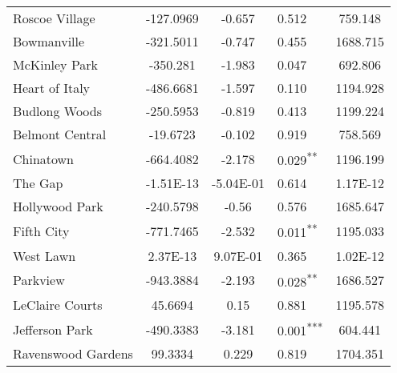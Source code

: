 \documentclass[12pt]{report}
\begin{document}
\begin{longtable}{l S[table-format=6.4] S[table-format=3.4] l S[table-format=4.4]}
	Roscoe Village               & -127.0969            & -0.657           & 0.512                      & 759.148                           \\
	Bowmanville                  & -321.5011            & -0.747           & 0.455                      & 1688.715                          \\
	McKinley Park                & -350.281             & -1.983           & 0.047                      & 692.806                           \\
	Heart of Italy               & -486.6681            & -1.597           & 0.110                      & 1194.928                          \\
	Budlong Woods                & -250.5953            & -0.819           & 0.413                      & 1199.224                          \\
	Belmont Central              & -19.6723             & -0.102           & 0.919                      & 758.569                           \\
	Chinatown                    & -664.4082            & -2.178           & 0.029\textsuperscript{**}  & 1196.199                          \\
	The Gap                      & -1.51E-13            & -5.04E-01        & 0.614                      & 1.17E-12                          \\
	Hollywood Park               & -240.5798            & -0.56            & 0.576                      & 1685.647                          \\
	Fifth City                   & -771.7465            & -2.532           & 0.011\textsuperscript{**}  & 1195.033                          \\
	West Lawn                    & 2.37E-13             & 9.07E-01         & 0.365                      & 1.02E-12                          \\
	Parkview                     & -943.3884            & -2.193           & 0.028\textsuperscript{**}  & 1686.527                          \\
	LeClaire Courts              & 45.6694              & 0.15             & 0.881                      & 1195.578                          \\
	Jefferson Park               & -490.3383            & -3.181           & 0.001\textsuperscript{***} & 604.441                           \\
	Ravenswood Gardens           & 99.3334              & 0.229            & 0.819                      & 1704.351                          \\

\end{longtable}
\end{document}
